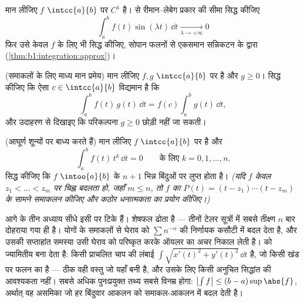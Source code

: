 \begin{exercise}[$\star\star\star$]\label{exo:b1:integration:10}
मान लीजिए $f$ $\intcc{a}{b}$ पर $C^1$ है।  से रीमान--लेबेग
प्रकार की सीमा सिद्ध कीजिए
\[
\int_a^b f(t)\sin(\lambda t)\,\dd t \xrightarrow[\lambda \to
+\infty]{} 0
\]
फिर उसे केवल  $f$ के लिए भी सिद्ध कीजिए, सोपान फलनों से एकसमान सन्निकटन
के द्वारा (\cref{thm:b1:integration:approx})।
\end{exercise}

\begin{exercise}[$\star\star$]\label{exo:b1:integration:11}
(समाकलों के लिए माध्य मान प्रमेय) मान लीजिए $f, g$ $\intcc{a}{b}$ पर  है
और $g \geq 0$। सिद्ध कीजिए कि ऐसा $c \in \intcc{a}{b}$ विद्यमान है कि
\[
\int_a^b f(t)\,g(t)\,\dd t = f(c)\int_a^b g(t)\,\dd t ,
\]
और उदाहरण से दिखाइए कि परिकल्पना $g \geq 0$ छोड़ी नहीं जा सकती।
\end{exercise}

\begin{exercise}[$\star\star\star$]\label{exo:b1:integration:12}
(आघूर्ण शून्यों पर बाध्य करते हैं) मान लीजिए $f$ $\intcc{a}{b}$ पर  है
और
\[
\int_a^b f(t)\,t^k\,\dd t = 0 \qquad \text{के लिए } k = 0, 1,
\dots, n .
\]
सिद्ध कीजिए कि $f$ $\intoo{a}{b}$ के $n + 1$ भिन्न बिंदुओं पर लुप्त होता है।
\emph{(यदि $f$ केवल $z_1 < \dots < z_m$ पर चिह्न बदलता हो, जहाँ $m \leq n$,
तो $f$ का $P(t) = (t - z_1) \cdots (t - z_m)$ के सामने समाकलन कीजिए और कठोर
धनात्मकता का प्रयोग कीजिए।)}
\end{exercise}

\begin{remark}[इस खंड के भीतर आगे की दृष्टि]
आगे के तीन अध्याय सीधे इसी पर टिके हैं।   शेषफल ढोता
है --- तीनों टेलर सूत्रों में सबसे तीक्ष्ण $n$ बार दोहराया गया 
ही है।  योगों के समाकलों से घेराव को $\sum n^{-\alpha}$
की निर्णायक कसौटी में बदल देता है, और उसकी सप्ताहांत समस्या उसी घेराव को
परिष्कृत करके ऑयलर का अचर निकाल लेती है।   को
ज्यामितीय बना देता है: किसी प्राचलित चाप की लंबाई $\int \sqrt{x'(t)^2 +
y'(t)^2}\,\dd t$ है, जो किसी खंड पर  फलन का  है --- ठीक वही वस्तु
जो यहाँ बनी है, और उसके लिए किसी अनुचित सिद्धांत की आवश्यकता नहीं। सबसे अधिक
पुनःप्रयुक्त तथ्य सबसे विनम्र होगा: $\bigl|\int f\bigr| \leq (b -
a)\sup\abs{f}$, अर्थात् वह असमिका जो हर बिंदुवार आकलन को समाकल-आकलन में बदल
देती है।
\end{remark}

